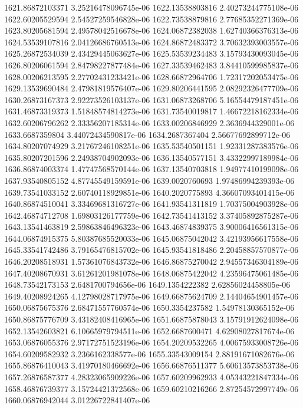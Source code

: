 {1621.86872103371 3.25216478096745e-06
1622.13538803816 2.40273244775108e-06
1622.60205529594 2.54527259546828e-06
1622.73538879816 2.77685352271369e-06
1623.80205681594 2.49578042516678e-06
1624.06872382038 1.62740366376313e-06
1624.53539107816 2.04126686760513e-06
1624.86872483372 3.70632393003557e-06
1625.26872534039 2.43429445063627e-06
1625.53539234483 3.15793430093045e-06
1626.80206061594 2.84798227877484e-06
1627.33539462483 3.84410599985837e-06
1628.00206213595 2.27702431233421e-06
1628.66872964706 1.72317202053475e-06
1629.13539690484 2.47981819576407e-06
1629.80206441595 2.08292326477709e-06
1630.26873167373 2.92273526103137e-06
1631.06873268706 5.16554479187451e-06
1631.46873319373 1.51848574814273e-06
1631.73540019817 1.46672218162334e-06
1632.60206796262 2.33356207185314e-06
1633.00206846929 2.3636944329001e-06
1633.6687359804 3.44072434590817e-06
1634.2687367404 2.56677692899712e-06
1634.80207074929 3.21767246108251e-06
1635.53540501151 1.92331287383576e-06
1635.80207201596 2.24938704902093e-06
1636.13540577151 3.43322997189984e-06
1636.86874003374 1.47747568570144e-06
1637.13540703818 1.94977410199098e-06
1637.93540805152 4.87745549159591e-06
1639.0020760693 1.97486994239393e-06
1639.73541033152 2.60740118929851e-06
1640.2020775893 4.36607093401415e-06
1640.86874510041 3.33469681316727e-06
1641.93541311819 1.70375004903928e-06
1642.46874712708 1.69803126177759e-06
1642.73541413152 3.37405892875287e-06
1643.13541463819 2.59863846496323e-06
1643.46874839375 3.90006416561315e-06
1644.06874915375 5.80387685520033e-06
1645.06875042042 3.42193956617558e-06
1645.33541742486 3.79165476815702e-06
1645.93541818486 2.20458857570877e-06
1646.20208518931 1.57361076843732e-06
1646.86875270042 2.94557346304189e-06
1647.40208670931 3.61261201981078e-06
1648.06875422042 4.23596475061485e-06
1648.73542173153 2.6481700794656e-06
1649.1354222382 2.62856024458805e-06
1649.40208924265 4.12798028717975e-06
1649.66875624709 2.14404654901457e-06
1650.06875675376 2.68471557760574e-06
1650.3354237582 1.54978130365152e-06
1650.86875776709 3.43182408416965e-06
1651.66875878043 3.15791912624098e-06
1652.13542603821 6.10665979794511e-06
1652.6687600471 4.62908027817674e-06
1653.06876055376 2.97172751523196e-06
1654.20209532265 4.00675933008726e-06
1654.60209582932 3.2366162338577e-06
1655.33543009154 2.88191671082676e-06
1655.86876410043 3.41970180466692e-06
1656.66876511377 5.60613573853738e-06
1657.26876587377 4.28323065909226e-06
1657.60209962933 4.05343221847334e-06
1658.46876739377 3.15724421372568e-06
1659.60210216266 2.87254572997749e-06
1660.06876942044 3.01226722841407e-06
}
